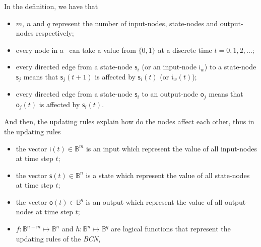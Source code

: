 In the definition, we have that %
\begin{itemize}
	\item $m$, $n$ and $q$ represent the number of input-nodes, state-nodes and output-nodes respectively;
          \item every node in a \BCN\ can take a value from $\{0,1\}$ at a discrete time $t=0, 1, 2,\ldots$;
	\item every directed edge from a state-node $\mathsf{s}_i$ (or an input-node $\mathsf{i}_w$) to a state-node $\mathsf{s}_j$ means that  $\mathsf{s}_j(t+1)$ is affected by $\mathsf{s}_i(t)$ (or $\mathfrak{i}_w(t)$);	
	\item every directed edge from a state-node $\mathsf{s}_i$ to an output-node $\mathsf{o}_j$ means that   $\mathsf{o}_j(t)$  is affected by $\mathsf{s}_i(t)$.  
	\end{itemize}
And then, the updating rules explain how do the nodes affect each other, thus in the updating rules
	\begin{itemize}
	\item the vector $\mathsf{i}(t)\in \mathbb{B}^m$ is an input which represent the value of all input-nodes at time step $t$; 	
	\item the vector $\mathsf{s}(t)\in \mathbb{B}^n$ is a state which represent the value of all state-nodes at time step $t$; 	
	\item the vector $\mathsf{o}(t)\in \mathbb{B}^q$ is an output which represent the value of all output-nodes at time step $t$;  
	\item $f:\mathbb{B}^{n+m}\mapsto \mathbb{B}^n$ and $h:\mathbb{B}^n\mapsto \mathbb{B}^q$ are logical functions that represent the updating rules of the {\em BCN},
\end{itemize}

